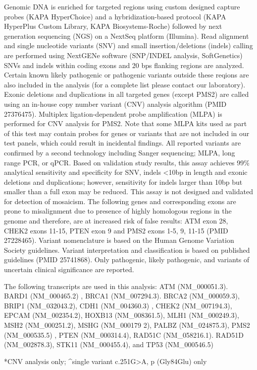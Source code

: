 \documentclass[9pt]{extarticle}
\begin{document}
Genomic DNA is enriched for targeted regions using custom designed capture probes (KAPA HyperChoice) and a hybridization-based protocol (KAPA HyperPlus Custom Library, KAPA Biosystems-Roche) followed by next generation sequencing (NGS) on a NextSeq platform (Illumina). Read alignment and single nucleotide variants (SNV) and small insertion/deletions (indels) calling are performed using NextGENe software (SNP/INDEL analysis, SoftGenetics) SNVs and indels within coding exons and 20 bps flanking regions are analyzed. Certain known likely pathogenic or pathogenic variants outside these reqions are also included in the analysis (for a complete list please contact our laboratory). Exonic deletions and duplications in all targeted genes (except PMS2) are called using an in-house copy number variant (CNV) analysis algorithm (PMID 27376475).  Multiplex ligation-dependent probe amplification (MLPA) is performed for CNV analysis for PMS2. Note that some MLPA kits used as part of this test may contain probes for genes or variants that are not included in our test panels, which could result in incidental findings. All reported variants are confirmed by a second technology including Sanger sequencing; MLPA, long range PCR, or qPCR. Based on validation study results, this assay achieves 99\% analytical sensitivity and specificity for SNV, indels <10bp in length and exonic deletions and duplications; however, sensitivity for indels larger than 10bp but smaller than a full exon may be reduced. This assay is not designed and validated for detection of mosaicism. The following genes and corresponding exons are prone to misalignment due to presence of highly homologous regions in the genome and therefore, are at increased risk of false results: ATM exon 28, CHEK2 exons 11-15, PTEN exon 9 and PMS2 exons 1-5, 9, 11-15 (PMID 27228465). Variant nomenclature is based on the Human Genome Variation Society guidelines. Variant interpretation and classification is based on published guidelines (PMID 25741868). Only pathogenic, likely pathogenic, and variants of uncertain clinical significance are reported.

The following transcripts are used in this analysis: ATM (NM\_000051.3). BARD1 (NM\_000465.2) , BRCA1 (NM\_007294.3). BRCA2 (NM\_000059.3), BRIP1 (NM\_032043.2), CDH1 (NM\_004360.3) , CHEK2 (NM\_007194.3), EPCAM (NM\_002354.2), HOXB13 (NM\_008361.5), MLH1 (NM\_000249.3), MSH2 (NM\_000251.2), MSHG (NM\_000179 2), PALBZ (NM\_024875.3), PMS2 (NM\_000535.5) , PTEN (NM\_000314.4), RAD51C (NM\_058216.1). RAD51D (NM\_002878.3), STK11 (NM\_000455.4), and TP53 (NM\_000546.5)

*CNV analysis only; \^{}single variant c.251G>A, p (Gly84Glu) only
\end{document}
